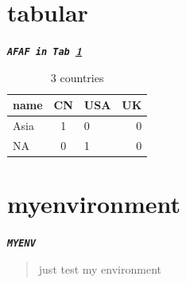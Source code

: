 \documentclass[12pt]{article} %
\newcommand{\myfont}[1]{\texttt{\textbf{\textit{#1}}}}
\newenvironment{myenv}{
\begin{center}\huge\myfont{MYENV}\end{center}
\begin{quote}\par
}{
\end{quote}
}
\begin{document}
    \section{tabular}
    \myfont{AFAF in Tab \ref{Tab3k}}
    \begin{table}[H]
        \centering
        \caption{\small 3 countries} \label{Tab3k}
        \begin{tabular}{l|c|p{5cm} r}
            \hline
            name & CN & USA & UK \\
            \hline
            Asia & 1 & 0 & 0 \\
            \hline
            NA & 0 & 1 & 0\\
            \hline
            \end{tabular}
    \end{table}

    \section{myenvironment}
    \begin{myenv}
        just test my environment
    \end{myenv}

    
\end{document}
